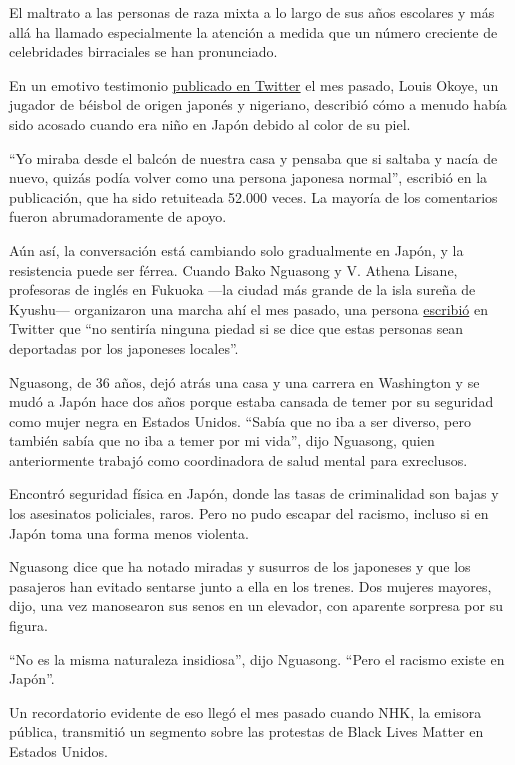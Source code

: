 El maltrato a las personas de raza mixta a lo largo de sus años
escolares y más allá ha llamado especialmente la atención a medida que
un número creciente de celebridades birraciales se han pronunciado.

En un emotivo testimonio
\href{https://twitter.com/LOUISOKOYEMoM/status/1272536049013514242}{publicado
en Twitter} el mes pasado, Louis Okoye, un jugador de béisbol de origen
japonés y nigeriano, describió cómo a menudo había sido acosado cuando
era niño en Japón debido al color de su piel.

``Yo miraba desde el balcón de nuestra casa y pensaba que si saltaba y
nacía de nuevo, quizás podía volver como una persona japonesa normal'',
escribió en la publicación, que ha sido retuiteada 52.000 veces. La
mayoría de los comentarios fueron abrumadoramente de apoyo.

Aún así, la conversación está cambiando solo gradualmente en Japón, y la
resistencia puede ser férrea. Cuando Bako Nguasong y V. Athena Lisane,
profesoras de inglés en Fukuoka ---la ciudad más grande de la isla
sureña de Kyushu--- organizaron una marcha ahí el mes pasado, una
persona
\href{https://twitter.com/randomyoko?ref_src=twsrc\%5Egoogle\%7Ctwcamp\%5Eserp\%7Ctwgr\%5Eauthor}{escribió}
en Twitter que ``no sentiría ninguna piedad si se dice que estas
personas sean deportadas por los japoneses locales''.

Nguasong, de 36 años, dejó atrás una casa y una carrera en Washington y
se mudó a Japón hace dos años porque estaba cansada de temer por su
seguridad como mujer negra en Estados Unidos. ``Sabía que no iba a ser
diverso, pero también sabía que no iba a temer por mi vida'', dijo
Nguasong, quien anteriormente trabajó como coordinadora de salud mental
para exreclusos.

Encontró seguridad física en Japón, donde las tasas de criminalidad son
bajas y los asesinatos policiales, raros. Pero no pudo escapar del
racismo, incluso si en Japón toma una forma menos violenta.

Nguasong dice que ha notado miradas y susurros de los japoneses y que
los pasajeros han evitado sentarse junto a ella en los trenes. Dos
mujeres mayores, dijo, una vez manosearon sus senos en un elevador, con
aparente sorpresa por su figura.

``No es la misma naturaleza insidiosa'', dijo Nguasong. ``Pero el
racismo existe en Japón''.

Un recordatorio evidente de eso llegó el mes pasado cuando NHK, la
emisora pública, transmitió un segmento sobre las protestas de Black
Lives Matter en Estados Unidos.

